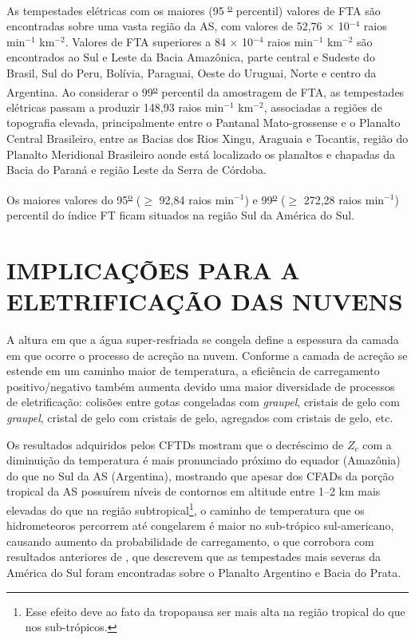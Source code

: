 As tempestades elétricas com os maiores (95 \textsuperscript{\underline{o}} percentil) valores de FTA são encontradas sobre uma vasta região da AS, com valores de 52,76 $\times$ 10$^{-4}$ raios min$^{-1}$ km$^{-2}$. Valores de FTA superiores a 84 $\times$ 10$^{-4}$ raios min$^{-1}$ km$^{-2}$ são encontrados ao Sul e Leste da Bacia Amazônica, parte central e Sudeste do Brasil, Sul do Peru, Bolívia, Paraguai, Oeste do Uruguai, Norte e centro da Argentina. Ao considerar o 99\textsuperscript{\underline{o}} percentil da amostragem de FTA, as tempestades elétricas passam a produzir 148,93 raios min$^{-1}$ km$^{-2}$, associadas a regiões de topografia elevada, principalmente entre o Pantanal Mato-grossense e o Planalto Central Brasileiro, entre as Bacias dos Rios Xingu, Araguaia e Tocantis, região do Planalto Meridional Brasileiro aonde está localizado os planaltos e chapadas da Bacia do Paraná e região Leste da Serra de Córdoba.


Os maiores valores do 95\textsuperscript{\underline{o}} ($\geq$ 92,84 raios min$^{-1}$) e 99\textsuperscript{\underline{o}} ($\geq$ 272,28 raios min$^{-1}$) percentil do índice FT ficam situados na região Sul da América do Sul.




\section{IMPLICAÇÕES PARA A ELETRIFICAÇÃO DAS NUVENS}


A altura em que a água super-resfriada se congela define a espessura da camada em que ocorre o processo de  acreção na nuvem. Conforme a camada de acreção se estende em um caminho maior de temperatura, a eficiência de carregamento positivo/negativo também aumenta devido uma maior diversidade de processos de eletrificação: colisões entre gotas congeladas com \textit{graupel}, cristais de gelo com \textit{graupel}, cristal de gelo com cristais de gelo, agregados com cristais de gelo,  etc. 

Os resultados adquiridos pelos CFTDs mostram que o decréscimo de $Z_c$ com a diminuição da temperatura é mais pronunciado próximo do equador (Amazônia) do que no Sul da AS (Argentina), mostrando que apesar dos CFADs da porção tropical da AS possuírem níveis de contornos em altitude entre 1--2 km mais elevadas do que na região subtropical\footnote{Esse efeito deve ao fato da tropopausa ser mais alta na região tropical do que nos sub-trópicos.}, o caminho de temperatura que os hidrometeoros percorrem até congelarem é maior no sub-trópico sul-americano, causando aumento da probabilidade de carregamento, o que corrobora com resultados anteriores de  , que descrevem que as tempestades mais severas da América do Sul foram encontradas sobre o Planalto Argentino e Bacia do Prata.
 
